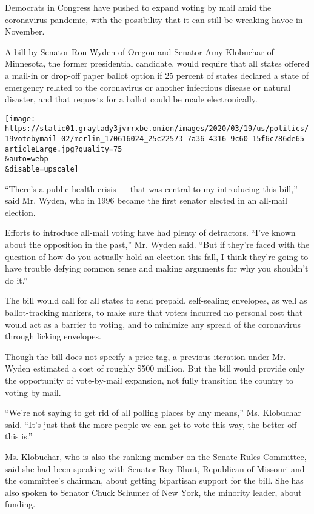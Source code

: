 Democrats in Congress have pushed to expand voting by mail amid the
coronavirus pandemic, with the possibility that it can still be wreaking
havoc in November.

A bill by Senator Ron Wyden of Oregon and Senator Amy Klobuchar of
Minnesota, the former presidential candidate, would require that all
states offered a mail-in or drop-off paper ballot option if 25 percent
of states declared a state of emergency related to the coronavirus or
another infectious disease or natural disaster, and that requests for a
ballot could be made electronically.

\texttt{[image: https://static01.graylady3jvrrxbe.onion/images/2020/03/19/us/politics/19votebymail-02/merlin\_170616024\_25c22573-7a36-4316-9c60-15f6c786de65-articleLarge.jpg?quality=75\\\&auto=webp\\\&disable=upscale]}

``There's a public health crisis --- that was central to my introducing
this bill,'' said Mr. Wyden, who in 1996 became the first senator
elected in an all-mail election.

Efforts to introduce all-mail voting have had plenty of detractors.
``I've known about the opposition in the past,'' Mr. Wyden said. ``But
if they're faced with the question of how do you actually hold an
election this fall, I think they're going to have trouble defying common
sense and making arguments for why you shouldn't do it.''

The bill would call for all states to send prepaid, self-sealing
envelopes, as well as ballot-tracking markers, to make sure that voters
incurred no personal cost that would act as a barrier to voting, and to
minimize any spread of the coronavirus through licking envelopes.

Though the bill does not specify a price tag, a previous iteration under
Mr. Wyden estimated a cost of roughly \$500 million. But the bill would
provide only the opportunity of vote-by-mail expansion, not fully
transition the country to voting by mail.

``We're not saying to get rid of all polling places by any means,'' Ms.
Klobuchar said. ``It's just that the more people we can get to vote this
way, the better off this is.''

Ms. Klobuchar, who is also the ranking member on the Senate Rules
Committee, said she had been speaking with Senator Roy Blunt, Republican
of Missouri and the committee's chairman, about getting bipartisan
support for the bill. She has also spoken to Senator Chuck Schumer of
New York, the minority leader, about funding.


